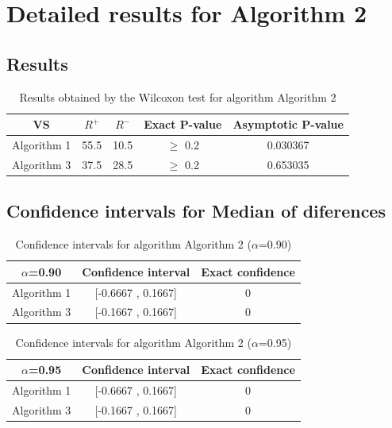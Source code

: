 \documentclass[a4paper,10pt]{article}
\begin{document}
 \clearpage 


\section{Detailed results for Algorithm 2}


\subsection{Results}

\begin{table}[!htp]
\centering\small
\begin{tabular}{
|c|c|c|c|c|}
\hline
 VS & $R^{+}$ & $R^{-}$ & Exact P-value & Asymptotic P-value \\ \hline 
Algorithm 1 & 55.5 & 10.5 & $\geq$ 0.2 & 0.030367\\ \hline 
Algorithm 3 & 37.5 & 28.5 & $\geq$ 0.2 & 0.653035\\ \hline 

\end{tabular}
\caption{Results obtained by the Wilcoxon test for algorithm Algorithm 2}
\end{table}

\subsection{Confidence intervals for Median of diferences}

\begin{table}[!htp]
\centering\small
\begin{tabular}{
|c|c|c|}
\hline
 $\alpha$=0.90 & Confidence interval & Exact confidence \\ \hline 
Algorithm 1 & [-0.6667 , 0.1667] & 0\\ \hline 
Algorithm 3 & [-0.1667 , 0.1667] & 0\\ \hline 

\end{tabular}
\caption{Confidence intervals for algorithm Algorithm 2 ($\alpha$=0.90)}
\end{table}
\begin{table}[!htp]
\centering\small
\begin{tabular}{
|c|c|c|}
\hline
 $\alpha$=0.95 & Confidence interval & Exact confidence \\ \hline 
Algorithm 1 & [-0.6667 , 0.1667] & 0\\ \hline 
Algorithm 3 & [-0.1667 , 0.1667] & 0\\ \hline 

\end{tabular}
\caption{Confidence intervals for algorithm Algorithm 2 ($\alpha$=0.95)}
\end{table}
\end{document}
